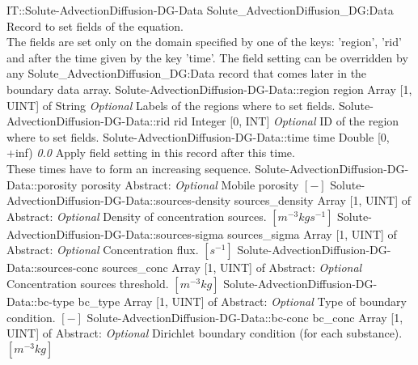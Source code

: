 \begin{RecordType}
	{IT::Solute-AdvectionDiffusion-DG-Data}
	{Solute{\_}AdvectionDiffusion{\_}DG:Data}
	{} %
	{} %
	{{{Record to set fields of the equation.}\\{
The fields are set only on the domain specified by one of the keys: 'region', 'rid'}\\{
and after the time given by the key 'time'. The field setting can be overridden by}\\{
 any Solute{\_}AdvectionDiffusion{\_}DG:Data record that comes later in the boundary data array.}}}
		\RecKey
			{Solute-AdvectionDiffusion-DG-Data::region}
			{region}
			{{Array [1, UINT] of }{String}}
			{ \it{Optional} }
			{{{Labels of the regions where to set fields. }}}
		\RecKey
			{Solute-AdvectionDiffusion-DG-Data::rid}
			{rid}
			{{Integer [0, INT]}}
			{ \it{Optional} }
			{{{ID of the region where to set fields.}}}
		\RecKey
			{Solute-AdvectionDiffusion-DG-Data::time}
			{time}
			{{Double [0, +inf)}}
			{ \it{0.0} }
			{{{Apply field setting in this record after this time.}\\{
These times have to form an increasing sequence.}}}
		\RecKey
			{Solute-AdvectionDiffusion-DG-Data::porosity}
			{porosity}
			{{Abstract}{: }}
			{ \it{Optional} }
			{{{Mobile porosity }{$[-]$}}}
		\RecKey
			{Solute-AdvectionDiffusion-DG-Data::sources-density}
			{sources{\_}density}
			{{Array [1, UINT] of }{Abstract}{: }}
			{ \it{Optional} }
			{{{Density of concentration sources. }{$[m^{-3}kgs^{-1}]$}}}
		\RecKey
			{Solute-AdvectionDiffusion-DG-Data::sources-sigma}
			{sources{\_}sigma}
			{{Array [1, UINT] of }{Abstract}{: }}
			{ \it{Optional} }
			{{{Concentration flux. }{$[s^{-1}]$}}}
		\RecKey
			{Solute-AdvectionDiffusion-DG-Data::sources-conc}
			{sources{\_}conc}
			{{Array [1, UINT] of }{Abstract}{: }}
			{ \it{Optional} }
			{{{Concentration sources threshold. }{$[m^{-3}kg]$}}}
		\RecKey
			{Solute-AdvectionDiffusion-DG-Data::bc-type}
			{bc{\_}type}
			{{Array [1, UINT] of }{Abstract}{: }}
			{ \it{Optional} }
			{{{Type of boundary condition. }{$[-]$}}}
		\RecKey
			{Solute-AdvectionDiffusion-DG-Data::bc-conc}
			{bc{\_}conc}
			{{Array [1, UINT] of }{Abstract}{: }}
			{ \it{Optional} }
			{{{Dirichlet boundary condition (for each substance). }{$[m^{-3}kg]$}}}

\end{RecordType}
